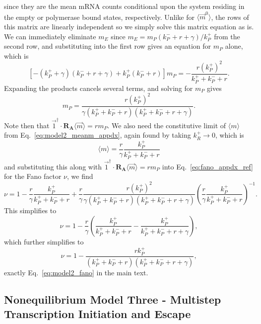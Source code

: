since they are the mean mRNA counts conditional upon the system residing in the
empty or polymerase bound states, respectively. Unlike for
$\langle\vec{m}^0\rangle$, the rows of this matrix are linearly independent so
we simply solve this matrix equation as is. We can immediately eliminate $m_E$
since $m_E = m_P (k_P^- + r + \gamma)/k_P^+$ from the second row, and
substituting into the first row gives an equation for $m_P$ alone, which is
\begin{equation}
\left[-(k_P^+ + \gamma)(k_P^- + r + \gamma) + k_P^+(k_P^- + r)\right] m_P
= - \frac{r (k_P^+)^2}{k_P^+ + k_P^- + r}.
\end{equation}
Expanding the products cancels several terms, and solving for $m_P$ gives
\begin{equation}
m_P = \frac{r (k_P^+)^2}
            {\gamma(k_P^+ + k_P^- + r)(k_P^+ + k_P^- + r + \gamma)}.
\end{equation}
Note then that $\vec{1}^\dagger\cdot\mathbf{R_A}\langle\vec{m}\rangle = rm_P$.
We also need the constitutive limit of $\langle{m}\rangle$ from
Eq.~\ref{eq:model2_meanm_appdx}, again found by taking $k_R^+\rightarrow0$,
which is
\begin{equation}
\langle{m}\rangle = \frac{r}{\gamma} \frac{k_P^+ } {k_P^+ + k_P^- + r}
\end{equation}
and substituting this along with
$\vec{1}^\dagger\cdot\mathbf{R_A}\langle\vec{m}\rangle = rm_P$ into
Eq.~\ref{eq:fano_appdx_ref} for the Fano factor $\nu$, we find
\begin{equation}
\nu = 1 - \frac{r}{\gamma} \frac{k_P^+ } {k_P^+ + k_P^- + r}
    + \frac{r}{\gamma}\frac{r (k_P^+)^2}{\gamma(k_P^+ + k_P^- + r)
                                        (k_P^+ + k_P^- + r + \gamma)}
\left(\frac{r}{\gamma} \frac{k_P^+ } {k_P^+ + k_P^- + r}\right)^{-1}.
\end{equation}
This simplifies to
\begin{equation}
\nu = 1 - \frac{r}{\gamma}
    \left(
        \frac{k_P^+ } {k_P^+ + k_P^- + r}
        - \frac{k_P^+ } {k_P^+ + k_P^- + r + \gamma}
    \right),
\end{equation}
which further simplifies to
\begin{equation}
\nu = 1 - \frac{r k_P^+ } {(k_P^+ + k_P^- + r)(k_P^+ + k_P^- + r + \gamma)},
\end{equation}
exactly Eq.~\ref{eq:model2_fano} in the main text.
    
\subsection{Nonequilibrium Model Three - Multistep Transcription Initiation and
Escape}

